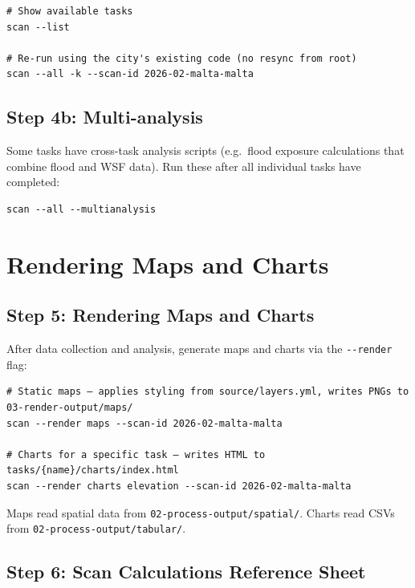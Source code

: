 \documentclass[
  letterpaper,
  DIV=11,
  numbers=noendperiod]{scrreprt}
\begin{document}
\begin{verbatim}
# Show available tasks
scan --list

# Re-run using the city's existing code (no resync from root)
scan --all -k --scan-id 2026-02-malta-malta
\end{verbatim}

\subsection{Step 4b: Multi-analysis}\label{step-4b-multi-analysis}

Some tasks have cross-task analysis scripts (e.g.~flood exposure
calculations that combine flood and WSF data). Run these after all
individual tasks have completed:

\begin{verbatim}
scan --all --multianalysis
\end{verbatim}

\section{Rendering Maps and Charts}\label{rendering-maps-and-charts}

\subsection{Step 5: Rendering Maps and
Charts}\label{step-5-rendering-maps-and-charts}

After data collection and analysis, generate maps and charts via the
\texttt{-\/-render} flag:

\begin{verbatim}
# Static maps — applies styling from source/layers.yml, writes PNGs to 03-render-output/maps/
scan --render maps --scan-id 2026-02-malta-malta

# Charts for a specific task — writes HTML to tasks/{name}/charts/index.html
scan --render charts elevation --scan-id 2026-02-malta-malta
\end{verbatim}

Maps read spatial data from \texttt{02-process-output/spatial/}. Charts
read CSVs from \texttt{02-process-output/tabular/}.

\subsection{Step 6: Scan Calculations Reference
Sheet}\label{step-6-scan-calculations-reference-sheet}
\end{document}
